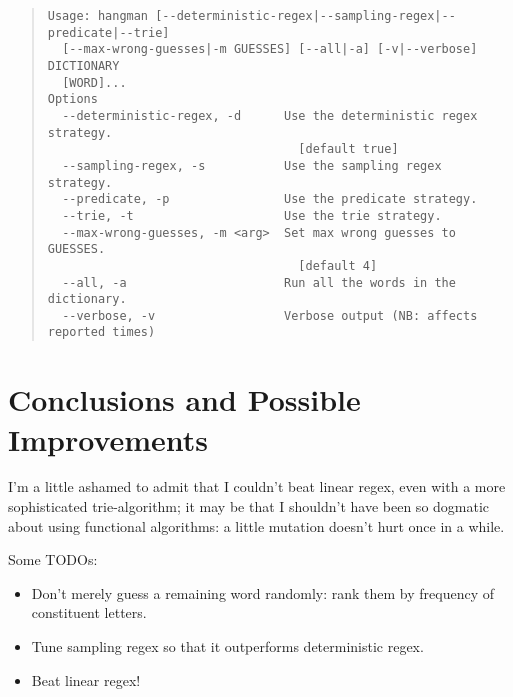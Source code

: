 \documentclass{article}
\begin{document}
\begin{quote}
\begin{verbatim}
Usage: hangman [--deterministic-regex|--sampling-regex|--predicate|--trie]
  [--max-wrong-guesses|-m GUESSES] [--all|-a] [-v|--verbose] DICTIONARY
  [WORD]...
Options
  --deterministic-regex, -d      Use the deterministic regex strategy.
                                   [default true]
  --sampling-regex, -s           Use the sampling regex strategy.                           
  --predicate, -p                Use the predicate strategy.                                
  --trie, -t                     Use the trie strategy.                                     
  --max-wrong-guesses, -m <arg>  Set max wrong guesses to GUESSES.
                                   [default 4]   
  --all, -a                      Run all the words in the dictionary.                       
  --verbose, -v                  Verbose output (NB: affects reported times)
\end{verbatim}
\end{quote}

\section{Conclusions and Possible Improvements}

I'm a little ashamed to admit that I couldn't beat linear regex, even
with a more sophisticated trie-algorithm; it may be that I shouldn't
have been so dogmatic about using functional algorithms: a little
mutation doesn't hurt once in a while.

Some TODOs:

\begin{itemize}
\item Don't merely guess a remaining word randomly: rank them by
  frequency of constituent letters.
\item Tune sampling regex so that it outperforms deterministic regex.
\item Beat linear regex!
\end{itemize}
\end{document}
